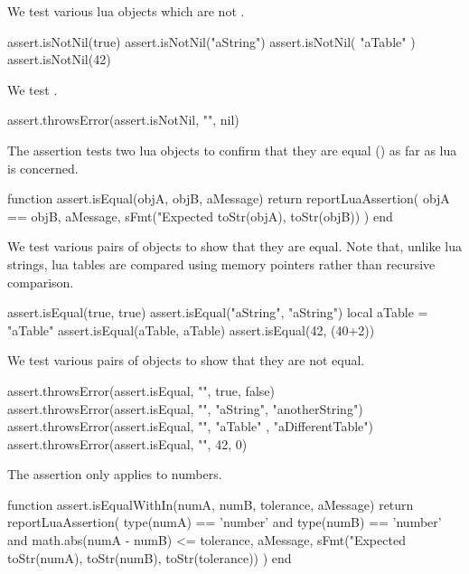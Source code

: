 We test various lua objects which are not .

\startLuaTest
  assert.isNotNil(true)
  assert.isNotNil("aString")
  assert.isNotNil({ "aTable" })
  assert.isNotNil(42)
\stopLuaTest
\stopTestCase


We test .

\startLuaTest
  assert.throwsError(assert.isNotNil, "", nil)
\stopLuaTest
\stopTestCase

\stopTestSuite


The  assertion tests two lua objects to confirm that 
they are equal (\type{==}) as far as lua is concerned. 

\startLuaCode
function assert.isEqual(objA, objB, aMessage)
  return reportLuaAssertion(
    objA == objB,
    aMessage,
    sFmt("Expected %
      toStr(objA), toStr(objB))
  )
end
\stopLuaCode


We test various pairs of objects to show that they are equal. Note that, 
unlike lua strings, lua tables are compared using memory pointers rather 
than recursive comparison. 

\startLuaTest
  assert.isEqual(true, true)
  assert.isEqual("aString", "aString")
  local aTable = { "aTable" }
  assert.isEqual(aTable, aTable)
  assert.isEqual(42, (40+2))
\stopLuaTest
\stopTestCase


We test various pairs of objects to show that they are not equal. 

\startLuaTest
  assert.throwsError(assert.isEqual, "", true, false)
  assert.throwsError(assert.isEqual, "",
    "aString", "anotherString")
  assert.throwsError(assert.isEqual, "",
    { "aTable" }, { "aDifferentTable"})
  assert.throwsError(assert.isEqual, "", 42, 0)
\stopLuaTest
\stopTestCase

\stopTestSuite


The  assertion only applies to numbers.

\startLuaCode
function assert.isEqualWithIn(numA, numB,
  tolerance, aMessage)
  return reportLuaAssertion(
    type(numA) == 'number' and type(numB) == 'number'
    and math.abs(numA - numB) <= tolerance,
    aMessage,
    sFmt("Expected %
      toStr(numA), toStr(numB), toStr(tolerance))
  )
end
\stopLuaCode

